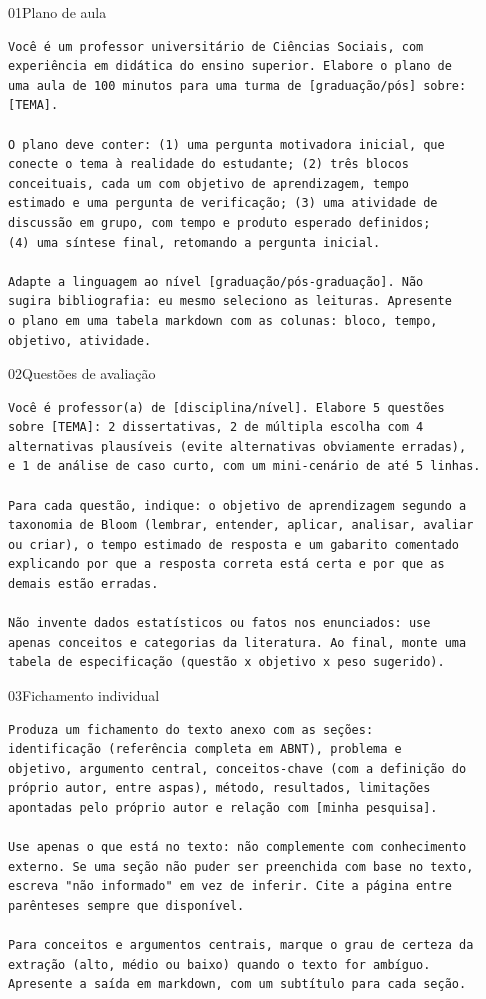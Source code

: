 \documentclass[11pt,a4paper]{article}
\begin{document}
\begin{modelo}{01}{Plano de aula}
\begin{lstlisting}
Você é um professor universitário de Ciências Sociais, com
experiência em didática do ensino superior. Elabore o plano de
uma aula de 100 minutos para uma turma de [graduação/pós] sobre:
[TEMA].

O plano deve conter: (1) uma pergunta motivadora inicial, que
conecte o tema à realidade do estudante; (2) três blocos
conceituais, cada um com objetivo de aprendizagem, tempo
estimado e uma pergunta de verificação; (3) uma atividade de
discussão em grupo, com tempo e produto esperado definidos;
(4) uma síntese final, retomando a pergunta inicial.

Adapte a linguagem ao nível [graduação/pós-graduação]. Não
sugira bibliografia: eu mesmo seleciono as leituras. Apresente
o plano em uma tabela markdown com as colunas: bloco, tempo,
objetivo, atividade.
\end{lstlisting}
\end{modelo}

\begin{modelo}{02}{Questões de avaliação}
\begin{lstlisting}
Você é professor(a) de [disciplina/nível]. Elabore 5 questões
sobre [TEMA]: 2 dissertativas, 2 de múltipla escolha com 4
alternativas plausíveis (evite alternativas obviamente erradas),
e 1 de análise de caso curto, com um mini-cenário de até 5 linhas.

Para cada questão, indique: o objetivo de aprendizagem segundo a
taxonomia de Bloom (lembrar, entender, aplicar, analisar, avaliar
ou criar), o tempo estimado de resposta e um gabarito comentado
explicando por que a resposta correta está certa e por que as
demais estão erradas.

Não invente dados estatísticos ou fatos nos enunciados: use
apenas conceitos e categorias da literatura. Ao final, monte uma
tabela de especificação (questão x objetivo x peso sugerido).
\end{lstlisting}
\end{modelo}

\begin{modelo}{03}{Fichamento individual}
\begin{lstlisting}
Produza um fichamento do texto anexo com as seções:
identificação (referência completa em ABNT), problema e
objetivo, argumento central, conceitos-chave (com a definição do
próprio autor, entre aspas), método, resultados, limitações
apontadas pelo próprio autor e relação com [minha pesquisa].

Use apenas o que está no texto: não complemente com conhecimento
externo. Se uma seção não puder ser preenchida com base no texto,
escreva "não informado" em vez de inferir. Cite a página entre
parênteses sempre que disponível.

Para conceitos e argumentos centrais, marque o grau de certeza da
extração (alto, médio ou baixo) quando o texto for ambíguo.
Apresente a saída em markdown, com um subtítulo para cada seção.
\end{lstlisting}
\end{modelo}
\end{document}
